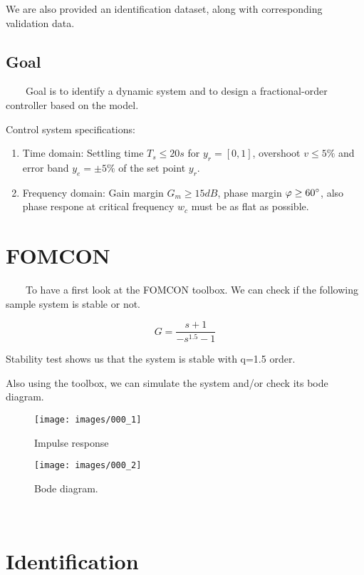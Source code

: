 \documentclass[12pt,a4paper]{article}
\begin{document}
We are also provided an identification dataset, along with corresponding validation data.

\subsection{Goal}

\ \ \ \ Goal is to identify a dynamic system and to design a fractional-order controller based on the model.

Control system specifications:

\begin{enumerate}
\item Time domain: Settling time $T_s \leq 20s$ for $y_r = [0,1]$, overshoot $v \leq 5 \%$ and error band $y_e = \pm 5\%$ of the set point $y_r$.
\item Frequency domain: Gain margin $G_m \geq 15dB$, phase margin $\varphi \geq 60 \degree$, also phase respone at critical frequency $w_c$ must be as flat as possible.
\end{enumerate}

\section{FOMCON}

\ \ \ \ To have a first look at the FOMCON toolbox. We can check if the following sample system is stable or not.

\begin{equation}
G = \frac{s + 1}{-s^1.5 - 1}
\end{equation}

Stability test shows us that the system is stable with q=1.5 order.

Also using the toolbox, we can simulate the system and/or check its bode diagram.

\begin{figure}[h]
	\caption{Impulse response}
	\texttt{[image: images/000\_1]}
	\centering
\end{figure}

\FloatBarrier

\begin{figure}[h]
	\caption{Bode diagram.}
	\texttt{[image: images/000\_2]}
	\centering
\end{figure}

\FloatBarrier

\ \ \ \ 

\section{Identification}
\end{document}
